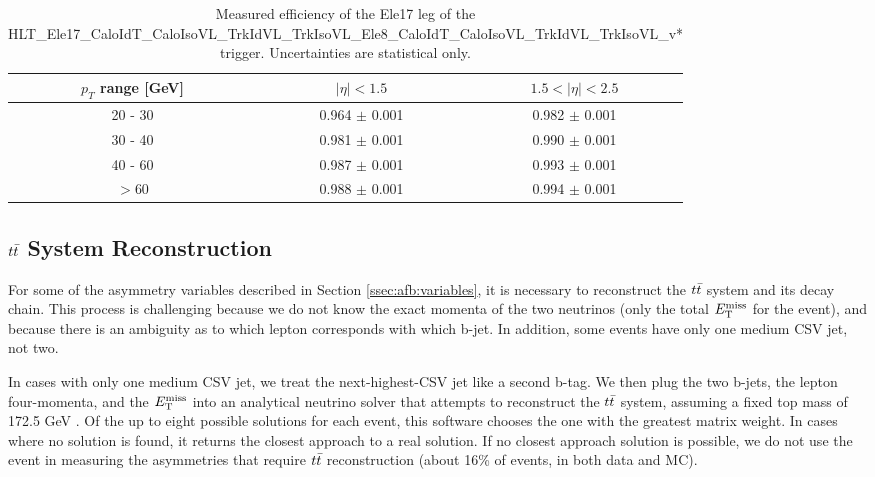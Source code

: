 \begin{table}[htbp]
\begin{center}
\footnotesize
\caption[Measured efficiency of the Ele17 leg of the dielectron
trigger. Uncertainties are statistical only.]
{Measured efficiency of the Ele17 leg of the
HLT\_Ele17\_CaloIdT\_CaloIsoVL\_TrkIdVL\_TrkIsoVL\_Ele8\_CaloIdT\_CaloIsoVL\_TrkIdVL\_TrkIsoVL\_v*
trigger. Uncertainties are statistical only.}
\label{tab:afb:trigeff:ele17}
\begin{tabular}{c|c|c}
\hline
\hline
  $p_T$ range [GeV] & $|\eta|<1.5$ & $1.5<|\eta|<2.5$\\
\hline
  20 -  30  & 0.964 $\pm$ 0.001 & 0.982 $\pm$ 0.001\\
  30 -  40  & 0.981 $\pm$ 0.001 & 0.990 $\pm$ 0.001\\
  40 -  60  & 0.987 $\pm$ 0.001 & 0.993 $\pm$ 0.001\\
  $>$60     & 0.988 $\pm$ 0.001 & 0.994 $\pm$ 0.001\\
\hline
\hline
\end{tabular}
\end{center}
\end{table}


\subsection{\texorpdfstring{$t\bar{t}$}{ttbar} System Reconstruction}
\label{ssec:afb:ttbarreconstruction}

For some of the asymmetry variables described in Section
\ref{ssec:afb:variables}, it is necessary to reconstruct the $t\bar{t}$
system and its decay chain. This process is challenging because we do not
know the exact momenta of the two neutrinos (only the total $E_\text{T}^\text{miss}$ for
the event), and because there is an ambiguity as to which lepton
corresponds with which b-jet. In addition, some events have only one
medium CSV jet, not two.

In cases with only one medium CSV jet, we treat the next-highest-CSV
jet like a second b-tag. We then plug the two b-jets, the lepton
four-momenta, and the $E_\text{T}^\text{miss}$ into an analytical neutrino solver that
attempts to reconstruct the $t\bar{t}$ system, assuming a fixed top mass
of 172.5 GeV \cite{nusolver}. Of the up to eight possible solutions
for each event, this software chooses the one with the greatest matrix
weight. In cases where no solution is found, it returns the closest
approach to a real solution. If no closest approach solution is
possible, we do not use the event in measuring the asymmetries that
require $t\bar{t}$ reconstruction (about 16\% of events, in both data
and MC).


